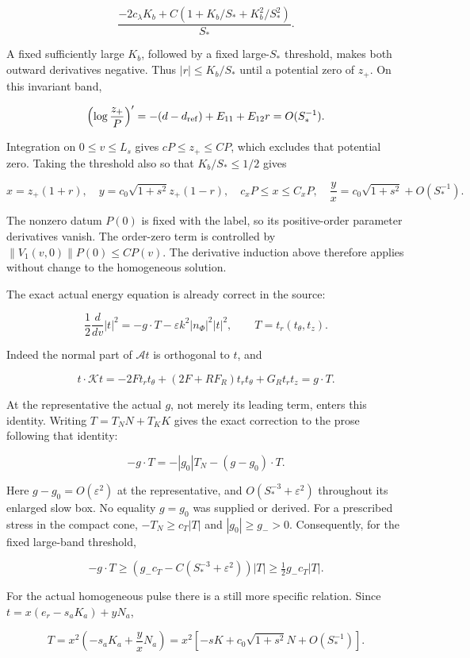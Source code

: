 \documentclass[10pt,a4paper]{article}
\begin{document}
\[
\frac{-2c_\lambda K_b+C(1+K_b/S_*+K_b^2/S_*^2)}{S_*}.
\]

A fixed sufficiently large \(K_b\), followed by a fixed large-\(S_*\) threshold, makes both outward derivatives negative. Thus \(|r|\le K_b/S_*\) until a potential zero of \(z_+\). On this invariant band,

\[
\left(\log\frac{z_+}{P}\right)'=-(d-d_{\rm ref})+E_{11}+E_{12}r=O(S_*^{-1}).
\]

Integration on \(0\le v\le L_s\) gives \(cP\le z_+\le CP\), which excludes that potential zero. Taking the threshold also so that \(K_b/S_*\le1/2\) gives

\[
x=z_+(1+r),\quad
y=c_0\sqrt{1+s^2}z_+(1-r),\quad
c_xP\le x\le C_xP,\quad
\frac yx=c_0\sqrt{1+s^2}+O(S_*^{-1}).
\]

The nonzero datum \(P(0)\) is fixed with the label, so its positive-order parameter derivatives vanish. The order-zero term is controlled by \(\|V_1(v,0)\|P(0)\le CP(v)\). The derivative induction above therefore applies without change to the homogeneous solution.

The exact actual energy equation is already correct in the source:

\[
\frac12\frac d{dv}|t|^2=-g\cdot T-\varepsilon k^2|n_\Phi|^2|t|^2,
\qquad T=t_r(t_\theta,t_z).
\]

Indeed the normal part of \(\mathcal At\) is orthogonal to \(t\), and

\[
t\cdot\mathcal Kt=-2Ft_rt_\theta+(2F+RF_R)t_rt_\theta+G_Rt_rt_z=g\cdot T.
\]

At the representative the actual \(g\), not merely its leading term, enters this identity. Writing \(T=T_NN+T_KK\) gives the exact correction to the prose following that identity:

\[
-g\cdot T=-|g_0|T_N-(g-g_0)\cdot T.
\]

Here \(g-g_0=O(\varepsilon^2)\) at the representative, and \(O(S_*^{-3}+\varepsilon^2)\) throughout its enlarged slow box. No equality \(g=g_0\) was supplied or derived. For a prescribed stress in the compact cone, \(-T_N\ge c_T|T|\) and \(|g_0|\ge g_->0\). Consequently, for the fixed large-band threshold,

\[
-g\cdot T\ge(g_-c_T-C(S_*^{-3}+\varepsilon^2))|T|
\ge\tfrac12g_-c_T|T|.
\]

For the actual homogeneous pulse there is a still more specific relation. Since \(t=x(e_r-s_aK_a)+yN_a\),

\[
T=x^2\left(-s_aK_a+\frac yxN_a\right)
=x^2\left[-sK+c_0\sqrt{1+s^2}N+O(S_*^{-1})\right].
\]
\end{document}
